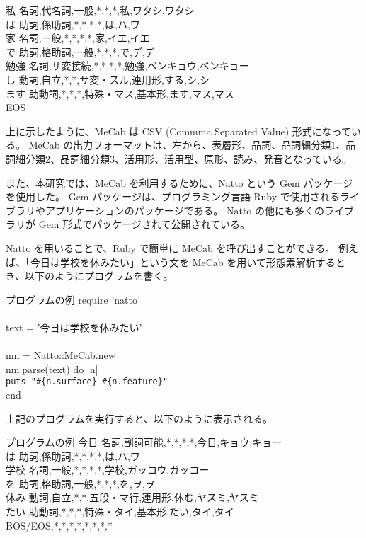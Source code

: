 \documentclass[11pt,a4j]{jsarticle}
\begin{document}
\begin{itembox}[l]
私  名詞,代名詞,一般,*,*,*,私,ワタシ,ワタシ\\
は  助詞,係助詞,*,*,*,*,は,ハ,ワ\\
家  名詞,一般,*,*,*,*,家,イエ,イエ\\
で  助詞,格助詞,一般,*,*,*,で,デ,デ\\
勉強  名詞,サ変接続,*,*,*,*,勉強,ベンキョウ,ベンキョー\\
し  動詞,自立,*,*,サ変・スル,連用形,する,シ,シ\\
ます  助動詞,*,*,*,特殊・マス,基本形,ます,マス,マス\\
EOS
\end{itembox}

上に示したように、MeCab は CSV (Commma Separated Value) 形式になっている。
MeCab の出力フォーマットは、左から、表層形、品詞、品詞細分類1、品詞細分類2、品詞細分類3、活用形、活用型、原形、読み、発音となっている。

また、本研究では、MeCab を利用するために、Natto という Gem パッケージを使用した。
Gem パッケージは、プログラミング言語 Ruby で使用されるライブラリやアプリケーションのパッケージである。
Natto の他にも多くのライブラリが Gem 形式でパッケージされて公開されている。

Natto を用いることで、Ruby で簡単に MeCab を呼び出すことができる。
例えば、「今日は学校を休みたい」という文を MeCab を用いて形態素解析するとき、以下のようにプログラムを書く。

\begin{itembox}[l]{プログラムの例}
require 'natto' \\ \\

text = '今日は学校を休みたい' \\ \\

nm = Natto::MeCab.new \\
nm.parse(text) do |n| \\
  \verb|puts "#{n.surface} #{n.feature}"| \\
end
\end{itembox}

上記のプログラムを実行すると、以下のように表示される。

\begin{itembox}[l]{プログラムの例}
  今日  名詞,副詞可能,*,*,*,*,今日,キョウ,キョー \\
  は  助詞,係助詞,*,*,*,*,は,ハ,ワ\\ 
  学校  名詞,一般,*,*,*,*,学校,ガッコウ,ガッコー\\
  を  助詞,格助詞,一般,*,*,*,を,ヲ,ヲ\\
  休み  動詞,自立,*,*,五段・マ行,連用形,休む,ヤスミ,ヤスミ\\
  たい  助動詞,*,*,*,特殊・タイ,基本形,たい,タイ,タイ\\
 BOS/EOS,*,*,*,*,*,*,*,*\\
\end{itembox}
\end{document}
